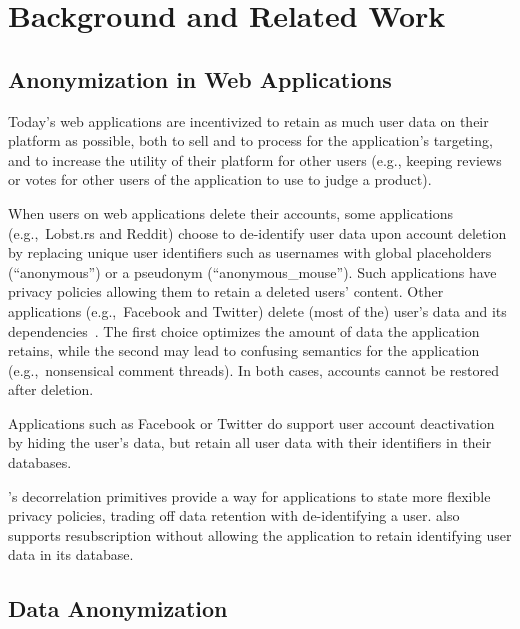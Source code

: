 \section{Background and Related Work}

\subsection{Anonymization in Web Applications}
Today's web applications are incentivized to retain as much user data on their platform as possible,
both to sell and to process for the application's targeting, and to increase the utility of their
platform for other users (e.g., keeping reviews or votes for other users of the application to use
to judge a product).

When users on web applications delete their accounts, some applications (e.g.,\ Lobst.rs and Reddit)
choose to de-identify user data upon account deletion by replacing unique user identifiers such as
usernames with global placeholders (``anonymous'') or a pseudonym (``anonymous\_mouse''). Such
applications have privacy policies allowing them to retain a deleted users' content.
Other applications (e.g.,\ Facebook and Twitter) delete (most of the) user's data and its
dependencies~\cite{delf}. 
The first choice optimizes the amount of data the application retains, while the second may lead to
confusing semantics for the application (e.g.,\ nonsensical comment threads). In both cases,
accounts cannot be restored after deletion. 

Applications such as Facebook or Twitter do support user account deactivation by hiding the user's
data, but retain all user data with their identifiers in their databases.  

\sys{}'s decorrelation primitives provide a way for applications to state more flexible privacy
policies, trading off data retention with de-identifying a user.
\sys{} also supports resubscription without allowing the application to retain identifying user data
in its database.

\subsection{Data Anonymization}

